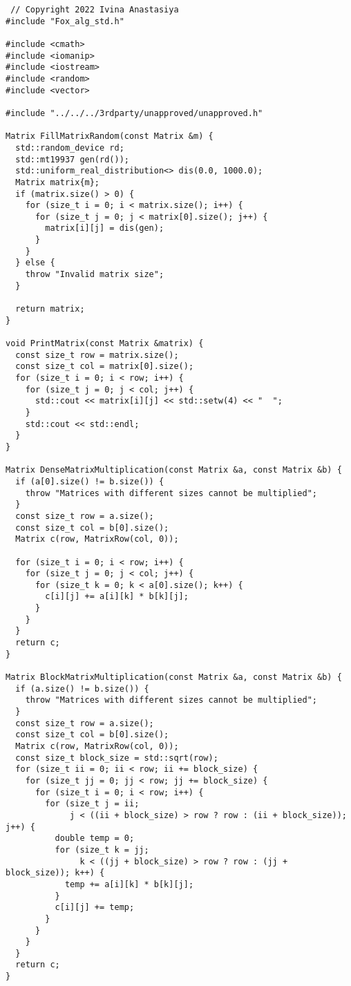 \documentclass{report}
\begin{document}
 \begin{lstlisting}
 // Copyright 2022 Ivina Anastasiya
#include "Fox_alg_std.h"

#include <cmath>
#include <iomanip>
#include <iostream>
#include <random>
#include <vector>

#include "../../../3rdparty/unapproved/unapproved.h"

Matrix FillMatrixRandom(const Matrix &m) {
  std::random_device rd;
  std::mt19937 gen(rd());
  std::uniform_real_distribution<> dis(0.0, 1000.0);
  Matrix matrix{m};
  if (matrix.size() > 0) {
    for (size_t i = 0; i < matrix.size(); i++) {
      for (size_t j = 0; j < matrix[0].size(); j++) {
        matrix[i][j] = dis(gen);
      }
    }
  } else {
    throw "Invalid matrix size";
  }

  return matrix;
}

void PrintMatrix(const Matrix &matrix) {
  const size_t row = matrix.size();
  const size_t col = matrix[0].size();
  for (size_t i = 0; i < row; i++) {
    for (size_t j = 0; j < col; j++) {
      std::cout << matrix[i][j] << std::setw(4) << "  ";
    }
    std::cout << std::endl;
  }
}

Matrix DenseMatrixMultiplication(const Matrix &a, const Matrix &b) {
  if (a[0].size() != b.size()) {
    throw "Matrices with different sizes cannot be multiplied";
  }
  const size_t row = a.size();
  const size_t col = b[0].size();
  Matrix c(row, MatrixRow(col, 0));

  for (size_t i = 0; i < row; i++) {
    for (size_t j = 0; j < col; j++) {
      for (size_t k = 0; k < a[0].size(); k++) {
        c[i][j] += a[i][k] * b[k][j];
      }
    }
  }
  return c;
}

Matrix BlockMatrixMultiplication(const Matrix &a, const Matrix &b) {
  if (a.size() != b.size()) {
    throw "Matrices with different sizes cannot be multiplied";
  }
  const size_t row = a.size();
  const size_t col = b[0].size();
  Matrix c(row, MatrixRow(col, 0));
  const size_t block_size = std::sqrt(row);
  for (size_t ii = 0; ii < row; ii += block_size) {
    for (size_t jj = 0; jj < row; jj += block_size) {
      for (size_t i = 0; i < row; i++) {
        for (size_t j = ii;
             j < ((ii + block_size) > row ? row : (ii + block_size)); j++) {
          double temp = 0;
          for (size_t k = jj;
               k < ((jj + block_size) > row ? row : (jj + block_size)); k++) {
            temp += a[i][k] * b[k][j];
          }
          c[i][j] += temp;
        }
      }
    }
  }
  return c;
}


\end{lstlisting}
\end{document}
